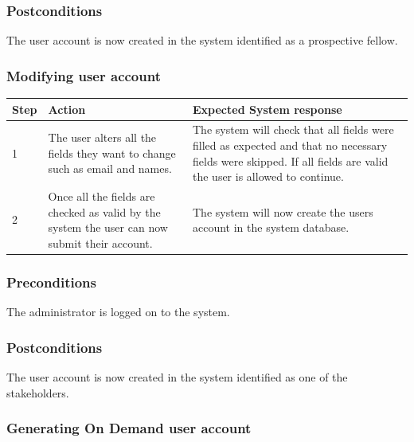 \documentclass[12pt]{article}
\begin{document}
\subsubsection*{Postconditions}
The user account is now created in the system identified as a prospective fellow.

\subsubsection{Modifying user account}

\begin{center}
\begin{tabular}{|l|p{6cm}|p{8cm}|}
\hline
Step & Action & Expected System response \\
\hline
1 & The user alters all the fields they want to change such as email and names. & The system will check that all fields were filled as expected and that no necessary fields were skipped. If all fields are valid the user is allowed to continue. \\
\hline
2 & Once all the fields are checked as valid by the system the user can now submit their account. & The system will now create the users account in the system database. \\
\hline
\end{tabular}
\end{center}

\subsubsection*{Preconditions}
The administrator is logged on to the system.

\subsubsection*{Postconditions}
The user account is now created in the system identified as one of the stakeholders.

\subsubsection{Generating On Demand user account}
\end{document}
